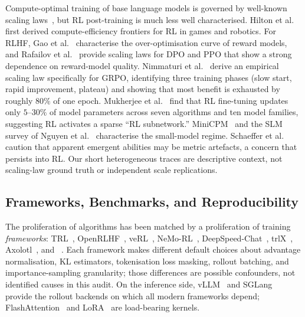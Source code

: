 Compute-optimal training of base language models is governed by
well-known scaling laws~\cite{kaplan2020scalinglaws, hoffmann2022chinchilla, muennighoff2023datascaling}, but RL post-training is much less well
characterised. Hilton et al.~\cite{hilton2023rlscaling} first derived
compute-efficiency frontiers for RL in games and robotics. For RLHF,
Gao et al.~\cite{gao2023reward} characterise the over-optimisation curve of
reward models, and Rafailov et al.~\cite{rafailov2024rlhfscaling} provide
scaling laws for DPO and PPO that show a strong dependence on reward-model
quality. Nimmaturi et al.~\cite{nimmaturi2025predictive} derive an
empirical scaling law specifically for GRPO, identifying three training
phases (slow start, rapid improvement, plateau) and showing that most
benefit is exhausted by roughly $80\%$ of one epoch. Mukherjee et
al.~\cite{liu2025rlsubnetworks} find that RL fine-tuning updates only
$5$--$30\%$ of model parameters across seven algorithms and ten model
families, suggesting RL activates a sparse ``RL subnetwork.''
MiniCPM~\cite{hu2024minicpm} and the SLM survey of
Nguyen et al.~\cite{subramanian2025slm} characterise the small-model
regime. Schaeffer et
al.~\cite{schaeffer2024emergent} caution that apparent emergent abilities may
be metric artefacts, a concern that persists into RL. Our short heterogeneous traces are descriptive context, not scaling-law
ground truth or independent scale replications.

\subsection{Frameworks, Benchmarks, and Reproducibility}
\label{sec:related:frameworks}

The proliferation of algorithms has been matched by a proliferation of
training \emph{frameworks}: TRL~\cite{vonwerra2022trl},
OpenRLHF~\cite{hu2024openrlhf}, veRL~\cite{sheng2024verl},
NeMo-RL~\cite{nvidia2024nemorl}, DeepSpeed-Chat~\cite{yao2023deepspeedchat},
trlX~\cite{havrilla2023trlx}, Axolotl~\cite{axolotl2024}, and
\tinker{}~\cite{thinkingmachines2024tinker}. Each framework makes different
default choices about advantage normalisation, KL estimators, tokenisation
loss masking, rollout batching, and importance-sampling granularity; those
differences are possible confounders, not identified causes in this audit.
On the inference side, vLLM~\cite{kwon2023vllm} and
SGLang~\cite{zheng2024sglang} provide the rollout backends on which all
modern frameworks depend; FlashAttention~\cite{dao2022flashattention} and
LoRA~\cite{hu2022lora} are load-bearing kernels.

